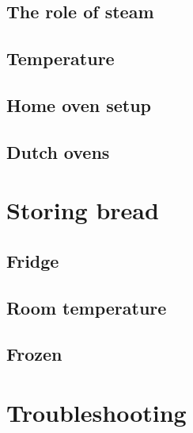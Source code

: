 \documentclass[a4paper, 12pt]{book}
\begin{document}
\section{The role of steam}
\section{Temperature}
\section{Home oven setup}
\section{Dutch ovens}

\chapter{Storing bread}
\section{Fridge}
\section{Room temperature}
\section{Frozen}

\chapter{Troubleshooting}




\printbibliography
\end{document}
